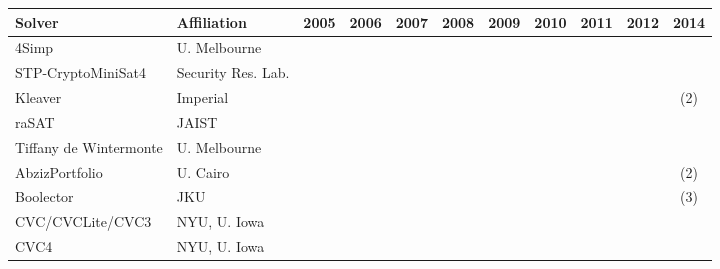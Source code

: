 \documentclass[twoside,11pt]{article}
\begin{document}
\begin{table}[t]
\renewcommand{\mark}[0]{\ding{51}}
\centering
\setlength{\tabcolsep}{1pt}
\begin{tabular}{|l|l|c|c|c|c|c|c|c|c|c|}
\hline
Solver & Affiliation & 2005 & 2006 & 2007 & 2008 & 2009 & 2010 & 2011 & 2012 & 2014 \\
\hline

4Simp                  & U. Melbourne 	&   &   &   &   &   &   &   &   & \mark  \\							
STP-CryptoMiniSat4     & Security Res. Lab.  &   &   &   &   &   &   &   &   & \mark\\								
Kleaver	               & Imperial       &   &   &   &   &   &   &   &   & (2) \\								
raSAT  	               & JAIST          &   &   &   &   &   &   &   &   & \mark \\								
Tiffany de Wintermonte & U. Melbourne 	&   &   &   &   &   &   &   & \mark &  \\							
AbzizPortfolio         & U. Cairo       &   &   &   &   &   &   &   & \mark & (2)\\							
Boolector              & JKU            &   &   &   & \mark & \mark &   & \mark & \mark & (3)\\
CVC/CVCLite/CVC3       & NYU, U. Iowa   & \mark & \mark & \mark & \mark & \mark & \mark & \mark & \mark & \mark \\
CVC4	                 & NYU, U. Iowa   &   &   &   &   &   & \mark & \mark & \mark & \mark \\


\end{tabular}
\end{table}
\end{document}
